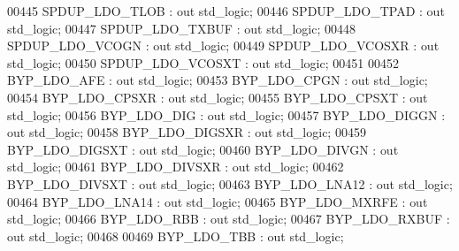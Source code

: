 \begin{DoxyCode}
00445         SPDUP\_LDO\_TLOB                  : \textcolor{keywordflow}{out} \textcolor{comment}{std\_logic};
00446         SPDUP\_LDO\_TPAD                  : \textcolor{keywordflow}{out} \textcolor{comment}{std\_logic};
00447         SPDUP\_LDO\_TXBUF                 : \textcolor{keywordflow}{out} \textcolor{comment}{std\_logic};
00448         SPDUP\_LDO\_VCOGN                 : \textcolor{keywordflow}{out} \textcolor{comment}{std\_logic};
00449         SPDUP\_LDO\_VCOSXR                : \textcolor{keywordflow}{out} \textcolor{comment}{std\_logic};
00450         SPDUP\_LDO\_VCOSXT                : \textcolor{keywordflow}{out} \textcolor{comment}{std\_logic};
00451 
00452         BYP\_LDO\_AFE                         : \textcolor{keywordflow}{out} \textcolor{comment}{std\_logic};
00453         BYP\_LDO\_CPGN                        : \textcolor{keywordflow}{out} \textcolor{comment}{std\_logic};
00454         BYP\_LDO\_CPSXR                       : \textcolor{keywordflow}{out} \textcolor{comment}{std\_logic};
00455         BYP\_LDO\_CPSXT                       : \textcolor{keywordflow}{out} \textcolor{comment}{std\_logic};
00456         BYP\_LDO\_DIG                         : \textcolor{keywordflow}{out} \textcolor{comment}{std\_logic};
00457         BYP\_LDO\_DIGGN                       : \textcolor{keywordflow}{out} \textcolor{comment}{std\_logic};
00458         BYP\_LDO\_DIGSXR                  : \textcolor{keywordflow}{out} \textcolor{comment}{std\_logic};
00459         BYP\_LDO\_DIGSXT                  : \textcolor{keywordflow}{out} \textcolor{comment}{std\_logic};
00460         BYP\_LDO\_DIVGN                       : \textcolor{keywordflow}{out} \textcolor{comment}{std\_logic};
00461         BYP\_LDO\_DIVSXR                  : \textcolor{keywordflow}{out} \textcolor{comment}{std\_logic};
00462         BYP\_LDO\_DIVSXT                  : \textcolor{keywordflow}{out} \textcolor{comment}{std\_logic};
00463         BYP\_LDO\_LNA12                       : \textcolor{keywordflow}{out} \textcolor{comment}{std\_logic};
00464         BYP\_LDO\_LNA14                       : \textcolor{keywordflow}{out} \textcolor{comment}{std\_logic};
00465         BYP\_LDO\_MXRFE                       : \textcolor{keywordflow}{out} \textcolor{comment}{std\_logic};
00466         BYP\_LDO\_RBB                         : \textcolor{keywordflow}{out} \textcolor{comment}{std\_logic};
00467         BYP\_LDO\_RXBUF                       : \textcolor{keywordflow}{out} \textcolor{comment}{std\_logic};
00468 
00469         BYP\_LDO\_TBB                     : \textcolor{keywordflow}{out} \textcolor{comment}{std\_logic};

\end{DoxyCode}
